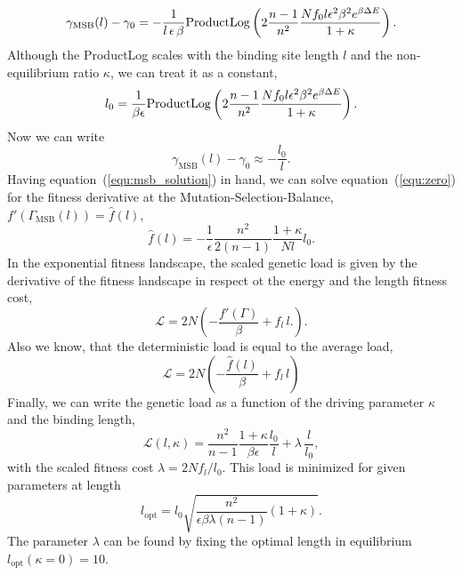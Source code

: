 \begin{equation}
\gamma_\mathrm{MSB}(l) - \gamma_0= -\frac{1}{l\,\epsilon\,\beta} \mathrm{ProductLog}\left(2 \frac{n-1}{n^2}\frac{ N f_0 l \epsilon^2 \beta^2e^{\beta\Delta E}}{1+\kappa}\right). \label{equ:intensive_scaling}
\end{equation}
Although the ProductLog scales with the binding site length $l$ and the non-equilibrium ratio $\kappa$, we can treat it as a constant,
\begin{equation}
	l_0 = \frac{1}{\beta\epsilon}\mathrm{ProductLog}\left(2 \frac{n-1}{n^2}\frac{ N f_0 l \epsilon^2 \beta^2e^{\beta\Delta E}}{1+\kappa}\right).\label{equ:l0_def}
\end{equation}
Now we can write
\begin{equation}
\gamma_\mathrm{MSB}(l) - \gamma_0\approx -\frac{l_0}{l}. \label{equ:intensive_scaling2}
\end{equation}
Having equation~(\ref{equ:msb_solution}) in hand, we can solve equation~(\ref{equ:zero}) for the fitness derivative at the Mutation-Selection-Balance,
 $f'\left(\Gamma_\mathrm{MSB}(l)\right)=\hat{f}(l)$,
 \begin{equation}
	\hat{f}(l) = -\frac{1}{\epsilon}\frac{n^2}{2(n-1)}\frac{1+\kappa}{N l}l_0.
\end{equation}
 In the exponential fitness landscape, the scaled genetic load is given by the derivative of the fitness landscape in respect ot the energy and the length fitness cost,
\begin{equation}
	\mathcal{L}= 2N\left(-\frac{f'(\Gamma)}{\beta}+f_l\,l.\right).
\end{equation}
Also we know, that the deterministic load is equal to the average load,
\begin{equation}
	\mathcal{L}= 2N\left(-\frac{\hat{f}(l)}{\beta}+f_l\,l\right)
\end{equation}
Finally, we can write the genetic load as a function of the driving parameter $\kappa$ and the binding length,
\begin{equation}
	\mathcal{L}(l,\kappa)=\frac{n^2}{n-1}\frac{1+\kappa}{\beta\epsilon}\frac{l_0}{l}+\lambda\,\frac{l}{l_0},
\end{equation} 
with the scaled fitness cost $\lambda=2Nf_l/l_0$. This load is minimized for given parameters at length
\begin{equation}
	l_\mathrm{opt} = l_0\sqrt{\frac{n^2}{\epsilon\beta \lambda (n-1)}(1+\kappa)}.
\end{equation}
The parameter $\lambda$ can be found by fixing the optimal length in equilibrium $l_\mathrm{opt}(\kappa=0)=10$.
